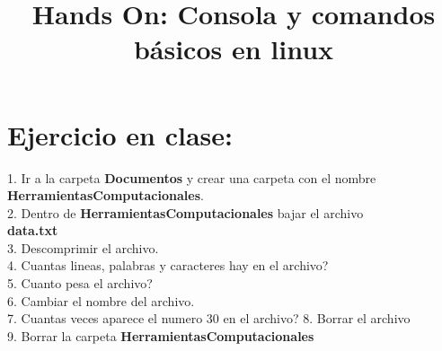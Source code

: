 \documentclass{article}
\title{Hands On: Consola y comandos b\'asicos en linux}
\begin{document}
\maketitle

\section{Ejercicio en clase:}

1. Ir a la carpeta \textbf{Documentos} y crear una carpeta con el nombre \textbf{HerramientasComputacionales}.\\
2. Dentro de \textbf{HerramientasComputacionales} bajar el archivo\\ \textbf{data.txt}\\
3. Descomprimir el archivo.\\
4. Cuantas lineas, palabras y caracteres hay en el archivo?\\
5. Cuanto pesa el archivo?	\\
6. Cambiar el nombre del archivo.\\
7. Cuantas veces aparece el numero 30 en el archivo?
8. Borrar el archivo\\
9. Borrar la carpeta \textbf{HerramientasComputacionales}
\end{document}
